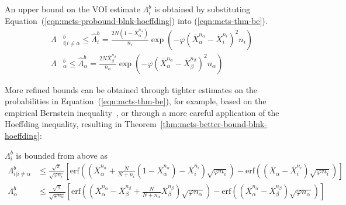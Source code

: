 \begin{crl}
An upper bound on the VOI estimate $\Lambda_i^b$ is obtained
by substituting Equation~(\ref{eqn:mcts-probound-blnk-hoeffding}) into (\ref{eqn:mcts-thm-be}).
\begin{align}
  \label{eqn:mcts-bound-blnk-hoeffding}
  \Lambda&_{i|i\ne\alpha}^b\le \hat\Lambda_i^b=  \frac {2N(1-\overline  X_\alpha^{n_\alpha})} {n_i}\exp\left(- \varphi(\overline X_\alpha^{n_\alpha} - \overline X_i^{n_i})^2 n_i\right)\\
  \Lambda&_\alpha^b \le \hat\Lambda_\alpha^b=\frac {2N\overline X_\beta^{n_\beta}} {n_\alpha}\exp\left(- \varphi(\overline X_\alpha^{n_\alpha} - \overline X_\beta^{n_\beta})^2 n_\alpha\right)\nonumber
\end{align}
\label{crl:bound-blnk-hoeffding}
\end{crl}

More refined bounds can be obtained through tighter estimates on the
probabilities in Equation~(\ref{eqn:mcts-thm-be}), for example, based on the empirical Bernstein
inequality~\cite{MaurerPontil.benrstein}, or through a more careful
application of the Hoeffding inequality, resulting in Theorem~\ref{thm:mcts-better-bound-blnk-hoeffding}:
\begin{thm} $\Lambda_i^b$ is bounded from above as
\begin{align}
\Lambda_{i|i\ne \alpha}^b&\le\frac {\sqrt \pi} {\sqrt {\varphi n_i}}
  \left[\mathrm{erf}\left(\left(\overline X_\alpha^{n_\alpha}+\frac N {N+n_i}(1-\overline X_\alpha^{n_\alpha})-\overline X_i^{n_i}\right)\sqrt {\varphi n_i}\right)
      -\mathrm{erf}\left((\overline X_\alpha - \overline X_i^{n_i})\sqrt{\varphi n_i}\right)\right]\nonumber\\
\Lambda_\alpha^b&\le\frac {\sqrt \pi} {\sqrt {\varphi n_\alpha}}
  \left[\mathrm{erf}\left(\left(\overline X_\alpha^{n_\alpha}-\overline X_\beta^{n_\beta}+\frac N {N+n_\alpha} \overline X_\beta^{n_\beta}\right)\sqrt {\varphi n_\alpha}\right)
      -\mathrm{erf}\left((\overline X_\alpha^{n_\alpha} - \overline X_\beta^{n_\beta})\sqrt{\varphi n_\alpha}\right)\right]
\label{eqn:mcts-erf-blinkered}
\end{align}
\label{thm:mcts-better-bound-blnk-hoeffding}
\end{thm}

